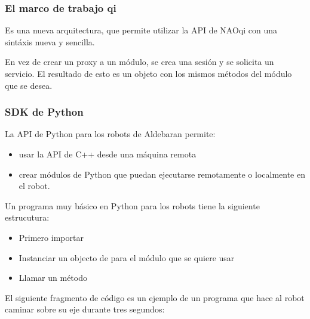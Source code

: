 \subsubsection{El marco de trabajo qi}
\label{\detokenize{chapter_one/naoqi:el-marco-de-trabajo-qi}}
Es una nueva arquitectura, que permite utilizar la API de NAOqi con una sintáxis
nueva y sencilla.

En vez de crear un proxy a un módulo, se crea una sesión y se solicita un
servicio. El resultado de esto es un objeto con los mismos métodos del
módulo que se desea.


\subsubsection{SDK de Python}
\label{\detokenize{chapter_one/naoqi:sdk-de-python}}
La API de Python para los robots de Aldebaran permite:
\begin{itemize}
\item {} 
usar la API de C++ desde una máquina remota

\item {} 
crear módulos de Python que puedan ejecutarse remotamente o localmente en el robot.

\end{itemize}

Un programa muy básico en Python para los robots tiene la siguiente estrucutura:
\begin{itemize}
\item {} 
Primero importar 

\item {} 
Instanciar un objecto de  para el módulo que se quiere usar

\item {} 
Llamar un método

\end{itemize}

El siguiente fragmento de código es un ejemplo de un programa que hace al robot
caminar sobre su eje  durante tres segundos:

